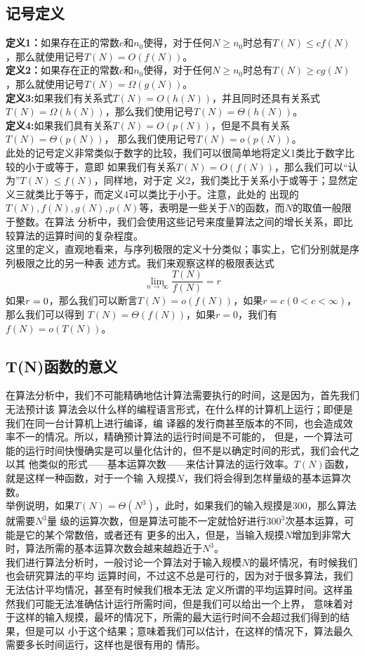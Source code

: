 \documentclass[a4paper,12pt]{ctexart}
\begin{document}
	\subsection{记号定义}
		\textbf{定义1：}如果存在正的常数$c$和$n_0$使得，对于任何$N\geqslant n_0$时总有$T(N)
		\leqslant c f(N)$，那么就使用记号$T(N)=O(f(N))$。\\
		\indent
		\textbf{定义2：}如果存在正的常数$c$和$n_0$使得，对于任何$N\geqslant n_0$时总有$T(N)
		\geqslant cg(N)$，那么就使用记号$T(N)=\Omega(g(N))$。\\
		\indent
		\textbf{定义3:}如果我们有关系式$T(N)=O(h(N))$，并且同时还具有关系式$T(N)=
		\Omega(h(N))$，那么我们使用记号$T(N)=\Theta(h(N))$。\\
		\indent
		\textbf{定义4:}如果我们具有关系$T(N)=O(p(N))$，但是不具有关系$T(N)=\Theta(p(N))$，
		那么我们使用记号$T(N)=o(p(N))$。\\
		\indent
		此处的记号定义非常类似于数字的比较，我们可以很简单地将定义1类比于数字比较的小于或等于，意即
		如果我们有关系$T(N)=O(f(N))$，那么我们可以“认为”$T(N)\leqslant f(N)$，同样地，对于定
		义2，我们类比于关系小于或等于；显然定义三就类比于等于，而定义4可以类比于小于。注意，此处的
		出现的$T(N),f(N),g(N),p(N)$等，表明是一些关于$N$的函数，而$N$的取值一般限于整数。在算法
		分析中，我们会使用这些记号来度量算法之间的增长关系，即比较算法的运算时间的复杂程度。\\
		\indent
		这里的定义，直观地看来，与序列极限的定义十分类似；事实上，它们分别就是序列极限之比的另一种表
		述方式。我们来观察这样的极限表达式
		$$
		\lim_{n \rightarrow \infty}\frac{T(N)}{f(N)}=r
		$$
		如果$r\\=0$，那么我们可以断言$T(N)=o(f(N))$，如果$r=c(0<c<\infty)$，那么我们可以得到
		$T(N)=\Theta(f(N))$，如果$r=0$，我们有$f(N)=o(T(N))$。
	\subsection{T(N)函数的意义}
		\indent 在算法分析中，我们不可能精确地估计算法需要执行的时间，这是因为，首先我们无法预计该
		算法会以什么样的编程语言形式，在什么样的计算机上运行；即便是我们在同一台计算机上进行编译，编
		译器的发行商甚至版本的不同，也会造成效率不一的情况。所以，精确预计算法的运行时间是不可能的，
		但是，一个算法可能的运行时间快慢确实是可以量化估计的，但不是以确定时间的形式，我们会代之以其
		他类似的形式——基本运算次数——来估计算法的运行效率。$T(N)$函数，就是这样一种函数，对于一个输
		入规摸$N$，我们将会得到怎样量级的基本运算次数。\\
		\indent
		举例说明，如果$T(N)=\Theta(N^3)$，此时，如果我们的输入规摸是300，那么算法就需要$N^3$量
		级的运算次数，但是算法可能不一定就恰好进行$300^3$次基本运算，可能是它的某个常数倍，或者还有
		更多的出入，但是，当输入规摸$N$增加到非常大时，算法所需的基本运算次数会越来越趋近于$N^3$。
		\\
		\indent
		我们进行算法分析时，一般讨论一个算法对于输入规模$N$的最坏情况，有时候我们也会研究算法的平均
		运算时间，不过这不总是可行的，因为对于很多算法，我们无法估计平均情况，甚至有时候我们根本无法
		定义所谓的平均运算时间。这样虽然我们可能无法准确估计运行所需时间，但是我们可以给出一个上界，
		意味着对于这样的输入规摸，最坏的情况下，所需的最大运行时间不会超过我们得到的结果，但是可以
		小于这个结果；意味着我们可以估计，在这样的情况下，算法最久需要多长时间运行，这样也是很有用的
		情形。
\end{document}
